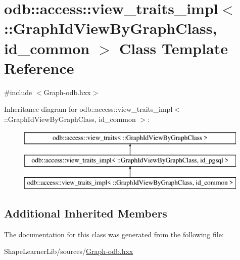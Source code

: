 \hypertarget{classodb_1_1access_1_1view__traits__impl_3_01_1_1_graph_id_view_by_graph_class_00_01id__common_01_4}{}\section{odb\+:\+:access\+:\+:view\+\_\+traits\+\_\+impl$<$ \+:\+:Graph\+Id\+View\+By\+Graph\+Class, id\+\_\+common $>$ Class Template Reference}
\label{classodb_1_1access_1_1view__traits__impl_3_01_1_1_graph_id_view_by_graph_class_00_01id__common_01_4}


{\ttfamily \#include $<$Graph-\/odb.\+hxx$>$}

Inheritance diagram for odb\+:\+:access\+:\+:view\+\_\+traits\+\_\+impl$<$ \+:\+:Graph\+Id\+View\+By\+Graph\+Class, id\+\_\+common $>$\+:\begin{figure}[H]
\begin{center}
\leavevmode
\includegraphics[height=3.000000cm]{d4/d97/classodb_1_1access_1_1view__traits__impl_3_01_1_1_graph_id_view_by_graph_class_00_01id__common_01_4}
\end{center}
\end{figure}
\subsection*{Additional Inherited Members}


The documentation for this class was generated from the following file\+:\begin{DoxyCompactItemize}
\item 
Shape\+Learner\+Lib/sources/\hyperlink{_graph-odb_8hxx}{Graph-\/odb.\+hxx}\end{DoxyCompactItemize}
